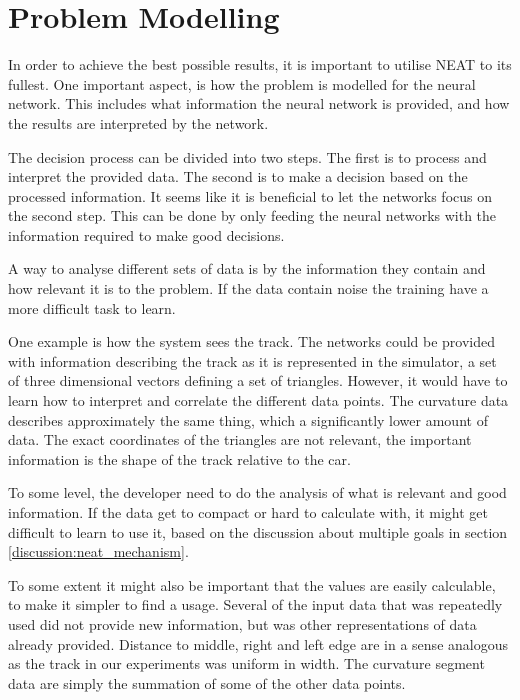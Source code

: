 \section{Problem Modelling}

In order to achieve the best possible results, it is important to utilise NEAT to its fullest. One important aspect, is how the problem is modelled for the neural network. This includes what information the neural network is provided, and how the results are interpreted by the network.  

The decision process can be divided into two steps. The first is to process and interpret the provided data. The second is to make a decision based on the processed information. It seems like it is beneficial to let the networks focus on the second step. This can be done by only feeding the neural networks with the information required to make good decisions. 


A way to analyse different sets of data is by the information they contain and how relevant it is to the problem. If the data contain noise the training have a more difficult task to learn.

One example is how the system sees the track. The networks could be provided with information describing the track as it is represented in the simulator, a set of three dimensional vectors defining a set of triangles. However, it would have to learn how to interpret and correlate the different data points. The curvature data describes approximately the same thing, which a significantly lower amount of data. The exact coordinates of the triangles are not relevant, the important information is the shape of the track relative to the car.  

To some level, the developer need to do the analysis of what is relevant and good information. If the data get to compact or hard to calculate with, it might get difficult to learn to use it, based on the discussion about multiple goals in section \ref{discussion:neat_mechanism}.

To some extent it might also be important that the values are easily calculable, to make it simpler to find a usage. Several of the input data that was repeatedly used did not provide new information, but was other representations of data already provided. Distance to middle, right and left edge are in a sense analogous as the track in our experiments was uniform in width. The curvature segment data are simply the summation of some of the other data points.

